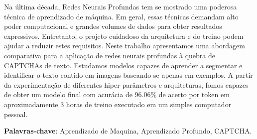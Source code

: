 \setlength{\absparsep}{18pt} %
\begin{resumo}

Na última década, Redes Neurais Profundas tem se mostrado uma poderosa técnica de aprendizado de máquina. Em geral, essas técnicas demandam alto poder computacional e grandes volumes de dados para obter resultados expressivos. Entretanto, o projeto cuidadoso da arquitetura e do treino podem ajudar a reduzir estes requisitos. Neste trabalho apresentamos uma abordagem comparativa para a aplicação de redes neurais profundas à quebra de CAPTCHAs de texto. Estudamos modelos capazes de aprender a segmentar e identificar o texto contido em imagens baseando-se apenas em exemplos. A partir da experimentação de diferentes hiper-parâmetros e arquiteturas, fomos capazes de obter um modelo final com acurácia de $96.06\%$ de acerto por token em aproximadamente 3 horas de treino executado em um simples computador pessoal.

\vspace{\onelineskip}

\noindent
\textbf{Palavras-chave}: Aprendizado de Maquina, Aprendizado Profundo, CAPTCHA.
\end{resumo}

